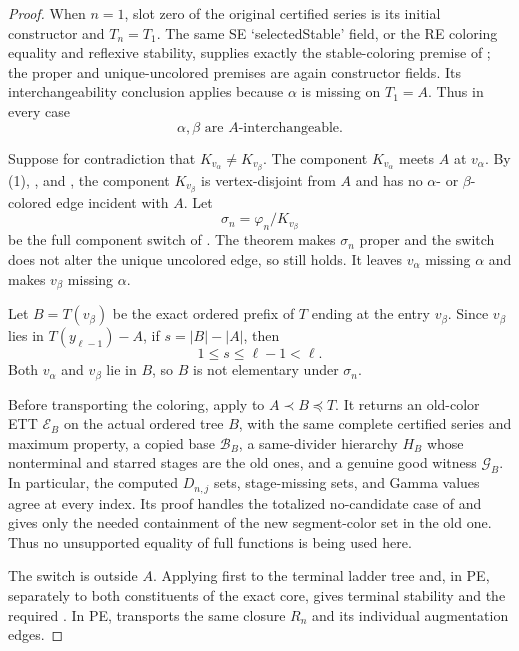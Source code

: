 \begin{proof}
When $n=1$, slot zero of the original certified series is its initial
constructor and $T_n=T_1$.  The same SE `selectedStable' field, or the
RE coloring equality and reflexive stability, supplies exactly the
stable-coloring premise of ; the proper
and unique-uncolored premises are again constructor fields.  Its
interchangeability conclusion applies because $\alpha$ is missing on
$T_1=A$.  Thus in every case
\[
                 \alpha,\beta\text{ are }A\text{-interchangeable}.
                                                               \tag{1}
\]

Suppose for contradiction that $K_{v_\alpha}\ne K_{v_\beta}$.
The component $K_{v_\alpha}$ meets $A$ at $v_\alpha$.  By (1),
, and
, the component $K_{v_\beta}$ is
vertex-disjoint from $A$ and has no $\alpha$- or $\beta$-colored edge
incident with $A$.  Let
\[
       \sigma_n=\varphi_n/K_{v_\beta}
\]
be the full component switch of .
The theorem  makes $\sigma_n$
proper and the switch does not alter the unique uncolored edge, so
 still holds.  It leaves
$v_\alpha$ missing $\alpha$ and makes $v_\beta$ missing $\alpha$.

Let $B=T(v_\beta)$ be the exact ordered prefix of $T$ ending at the
entry $v_\beta$.  Since $v_\beta$ lies in $T(y_{\ell-1})-A$, if
$s=|B|-|A|$, then
\[
                         1\leq s\leq\ell-1<\ell.               \tag{2}
\]
Both $v_\alpha$ and $v_\beta$ lie in $B$, so $B$ is not elementary
under $\sigma_n$.

Before transporting the coloring, apply
 to
$A\prec B\preccurlyeq T$.  It returns an old-color ETT
$\mathcal E_B$ on the actual ordered tree $B$, with the same complete
certified series and maximum property, a copied base $\mathcal B_B$, a
same-divider hierarchy $H_B$ whose nonterminal and starred stages are
the old ones, and a genuine good witness $\mathcal G_B$.  In particular,
the computed $D_{n,j}$ sets, stage-missing sets, and Gamma values agree
at every index.  Its proof handles the totalized no-candidate case of
 and gives only the needed
containment of the new segment-color set in the old one.  Thus no
unsupported equality of full  functions
is being used here.

The switch is outside $A$.  Applying
 first to the terminal ladder tree
and, in PE, separately to both constituents of the exact core, gives
terminal stability and the required
.  In PE,
 transports the same closure
$R_n$ and its individual augmentation edges.


\end{proof}
